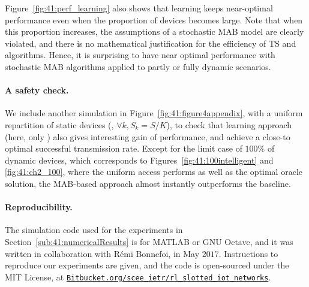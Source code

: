 Figure~\ref{fig:41:perf_learning} also shows that learning keeps near-optimal performance even when the proportion of devices becomes large.
Note that when this proportion increases, the assumptions of a stochastic MAB model are clearly violated, and there is no mathematical justification for the efficiency of TS and \UCB{} algorithms.
Hence, it is surprising to have near optimal performance with stochastic MAB algorithms applied to partly or fully dynamic scenarios.


\paragraph{A safety check.}
%
We include another simulation in Figure~\ref{fig:41:figure4appendix}, with a uniform repartition of static devices (\ie, $\forall k, S_k = S/K$), to check that learning approach (here, only \UCB)
also gives interesting gain of performance, and achieve a close-to optimal successful transmission rate.
Except for the limit case of $100\%$ of dynamic devices, which corresponds to Figures~\ref{fig:41:100intelligent} and \ref{fig:41:ch2_100}, where the uniform access performs as well as the optimal oracle solution, the MAB-based approach almost instantly outperforms the baseline.


\newpage %

\paragraph{Reproducibility.}
%
The simulation code used for the experiments in Section~\ref{sub:41:numericalResults} is for MATLAB or GNU Octave,
and it was written in collaboration with Rémi Bonnefoi, in May $2017$.
Instructions to reproduce our experiments are given, and
the code is open-sourced under the MIT License, at
\href{https://Bitbucket.org/scee_ietr/rl_slotted_iot_networks}{\texttt{Bitbucket.org/scee\_ietr/rl\_slotted\_iot\_networks}}.
